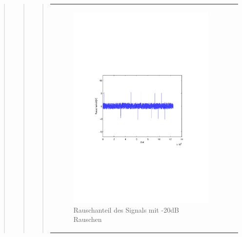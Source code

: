\begin{quote}
\begin{quote}
\begin{quote}
\begin{center}
\begin{tabular}{ll}
\begin{minipage}{0.6\textwidth}
                \begin{figure}[H]
                    \label{fig:rau20}
                    \includegraphics[scale=0.7, trim = 20mm 80mm 20mm 90mm, clip]{Bilder/rau20}
                    \caption{Rauschanteil des Signals mit -20dB Rauschen}
                \end{figure}
        
            \end{minipage}
        

\end{tabular}
\end{center}
\end{quote}
\end{quote}
\end{quote}
